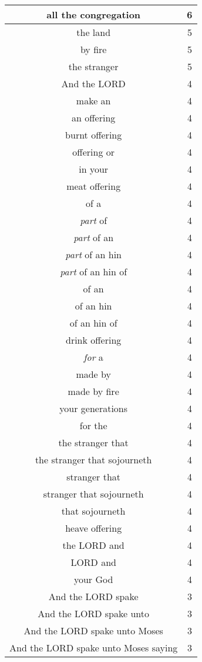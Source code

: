 \begin{center}
\begin{longtable}{|c|c|}
all the congregation & 6\\ \hline 
the land & 5\\ \hline 
by fire & 5\\ \hline 
the stranger & 5\\ \hline 
And the LORD & 4\\ \hline 
make an & 4\\ \hline 
an offering & 4\\ \hline 
burnt offering & 4\\ \hline 
offering or & 4\\ \hline 
in your & 4\\ \hline 
meat offering & 4\\ \hline 
of a & 4\\ \hline 
\emph{part} of & 4\\ \hline 
\emph{part} of an & 4\\ \hline 
\emph{part} of an hin & 4\\ \hline 
\emph{part} of an hin of & 4\\ \hline 
of an & 4\\ \hline 
of an hin & 4\\ \hline 
of an hin of & 4\\ \hline 
drink offering & 4\\ \hline 
\emph{for} a & 4\\ \hline 
made by & 4\\ \hline 
made by fire & 4\\ \hline 
your generations & 4\\ \hline 
for the & 4\\ \hline 
the stranger that & 4\\ \hline 
the stranger that sojourneth & 4\\ \hline 
stranger that & 4\\ \hline 
stranger that sojourneth & 4\\ \hline 
that sojourneth & 4\\ \hline 
heave offering & 4\\ \hline 
the LORD and & 4\\ \hline 
LORD and & 4\\ \hline 
your God & 4\\ \hline 
And the LORD spake & 3\\ \hline 
And the LORD spake unto & 3\\ \hline 
And the LORD spake unto Moses & 3\\ \hline 
And the LORD spake unto Moses saying & 3\\ \hline 

\end{longtable}
\end{center}
